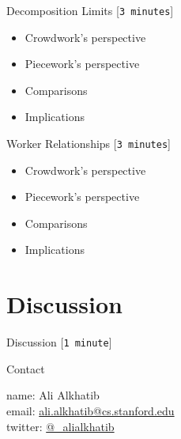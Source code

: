 \documentclass{beamer}
\begin{document}
\begin{frame}{Decomposition Limits
                                                                                [\texttt{3 minutes}]
}
\begin{itemize}[<+- | alert@+>]
  \item Crowdwork's perspective
  \item Piecework's perspective
  \item Comparisons
  \item Implications
\end{itemize}
\end{frame}

\begin{frame}{Worker Relationships
                                                                                [\texttt{3 minutes}]
}
\begin{itemize}[<+- | alert@+>]
  \item Crowdwork's perspective
  \item Piecework's perspective
  \item Comparisons
  \item Implications
\end{itemize}
\end{frame}

\section{Discussion}
\begin{frame}{Discussion
                                                                                [\texttt{1 minute}]
}
\end{frame}



\begin{frame}{Contact}

    name: {Ali Alkhatib} \\
    email: \href{mailto:ali.alkhatib@cs.stanford.edu}{ali.alkhatib@cs.stanford.edu} \\
    twitter: \href{https://twitter.com/_alialkhatib}{@\_alialkhatib} \\
\end{frame}


% 
\printbibliography{}
\end{document}
